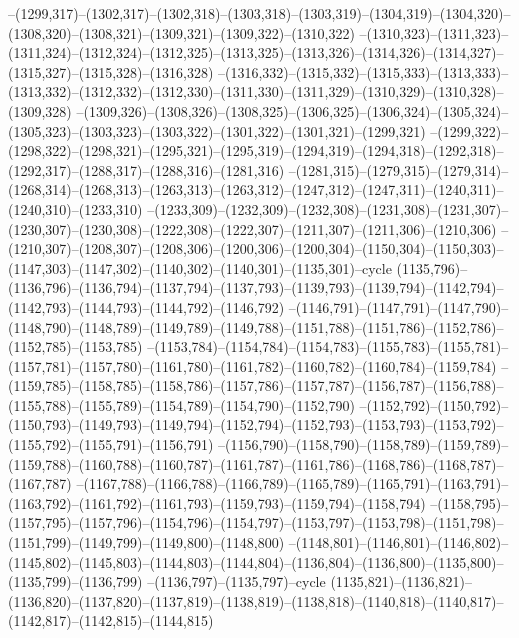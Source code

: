 --(1299,317)--(1302,317)--(1302,318)--(1303,318)--(1303,319)--(1304,319)--(1304,320)--(1308,320)--(1308,321)--(1309,321)--(1309,322)--(1310,322)
--(1310,323)--(1311,323)--(1311,324)--(1312,324)--(1312,325)--(1313,325)--(1313,326)--(1314,326)--(1314,327)--(1315,327)--(1315,328)--(1316,328)
--(1316,332)--(1315,332)--(1315,333)--(1313,333)--(1313,332)--(1312,332)--(1312,330)--(1311,330)--(1311,329)--(1310,329)--(1310,328)--(1309,328)
--(1309,326)--(1308,326)--(1308,325)--(1306,325)--(1306,324)--(1305,324)--(1305,323)--(1303,323)--(1303,322)--(1301,322)--(1301,321)--(1299,321)
--(1299,322)--(1298,322)--(1298,321)--(1295,321)--(1295,319)--(1294,319)--(1294,318)--(1292,318)--(1292,317)--(1288,317)--(1288,316)--(1281,316)
--(1281,315)--(1279,315)--(1279,314)--(1268,314)--(1268,313)--(1263,313)--(1263,312)--(1247,312)--(1247,311)--(1240,311)--(1240,310)--(1233,310)
--(1233,309)--(1232,309)--(1232,308)--(1231,308)--(1231,307)--(1230,307)--(1230,308)--(1222,308)--(1222,307)--(1211,307)--(1211,306)--(1210,306)
--(1210,307)--(1208,307)--(1208,306)--(1200,306)--(1200,304)--(1150,304)--(1150,303)--(1147,303)--(1147,302)--(1140,302)--(1140,301)--(1135,301)--cycle
(1135,796)--(1136,796)--(1136,794)--(1137,794)--(1137,793)--(1139,793)--(1139,794)--(1142,794)--(1142,793)--(1144,793)--(1144,792)--(1146,792)
--(1146,791)--(1147,791)--(1147,790)--(1148,790)--(1148,789)--(1149,789)--(1149,788)--(1151,788)--(1151,786)--(1152,786)--(1152,785)--(1153,785)
--(1153,784)--(1154,784)--(1154,783)--(1155,783)--(1155,781)--(1157,781)--(1157,780)--(1161,780)--(1161,782)--(1160,782)--(1160,784)--(1159,784)
--(1159,785)--(1158,785)--(1158,786)--(1157,786)--(1157,787)--(1156,787)--(1156,788)--(1155,788)--(1155,789)--(1154,789)--(1154,790)--(1152,790)
--(1152,792)--(1150,792)--(1150,793)--(1149,793)--(1149,794)--(1152,794)--(1152,793)--(1153,793)--(1153,792)--(1155,792)--(1155,791)--(1156,791)
--(1156,790)--(1158,790)--(1158,789)--(1159,789)--(1159,788)--(1160,788)--(1160,787)--(1161,787)--(1161,786)--(1168,786)--(1168,787)--(1167,787)
--(1167,788)--(1166,788)--(1166,789)--(1165,789)--(1165,791)--(1163,791)--(1163,792)--(1161,792)--(1161,793)--(1159,793)--(1159,794)--(1158,794)
--(1158,795)--(1157,795)--(1157,796)--(1154,796)--(1154,797)--(1153,797)--(1153,798)--(1151,798)--(1151,799)--(1149,799)--(1149,800)--(1148,800)
--(1148,801)--(1146,801)--(1146,802)--(1145,802)--(1145,803)--(1144,803)--(1144,804)--(1136,804)--(1136,800)--(1135,800)--(1135,799)--(1136,799)
--(1136,797)--(1135,797)--cycle
(1135,821)--(1136,821)--(1136,820)--(1137,820)--(1137,819)--(1138,819)--(1138,818)--(1140,818)--(1140,817)--(1142,817)--(1142,815)--(1144,815)
